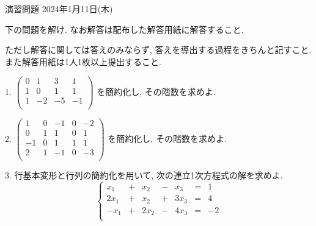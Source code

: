 \documentclass[dvipdfmx,a4paper,11pt]{article}
\theoremstyle{definition}
\begin{document}
\newpage 



\begin{center}
{\Large 演習問題  2024年1月11日(木) } 
\end{center}




\begin{center}
 {\large 下の問題を解け. なお解答は配布した解答用紙に解答すること.}
  \end{center}
 ただし解答に関しては答えのみならず, 答えを導出する過程をきちんと記すこと. 
 また解答用紙は1人1枚以上提出すること.
 
  \vspace{11pt}
 
  1.
$
 \begin{pmatrix}
 0& 1& 3  & 1\\
 1& 0& 1  & 1\\
  1& -2& -5  & -1\\
 \end{pmatrix}
 $
 を簡約化し, その階数を求めよ.

2.
$
 \begin{pmatrix}
 1& 0& -1  & 0&-2\\
 0& 1& 1  & 0&1\\
  -1& 0& 1 & 1&1\\
 2& 1& -1 & 0&-3\\
 \end{pmatrix}
 $
 を簡約化し, その階数を求めよ.
 
 3. 行基本変形と行列の簡約化を用いて, 次の連立1次方程式の解を求めよ.
 $$
 \left\{ 
\begin{matrix}
x_1&+&x_2& -&x_3 &= & 1\\
2x_1&+&x_2& +&3x_3&= &4 \\
-x_1&+&2x_2& -&4x_3 &= &-2 \\
\end{matrix}
\right.
 $$
\end{document}
